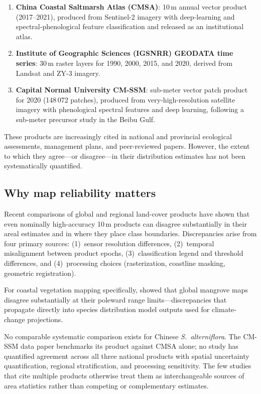 \documentclass[11pt]{article}
\begin{document}
\begin{enumerate}[nosep]
\item \textbf{China Coastal Saltmarsh Atlas (CMSA)}: 10\,m annual vector product
  (2017--2021), produced from Sentinel-2 imagery with deep-learning and
  spectral-phenological feature classification\citep{li_2024_cmsa} and released
  as an institutional atlas\citep{cmsa_2024_release}.
\item \textbf{Institute of Geographic Sciences (IGSNRR) GEODATA time series}:
  30\,m raster layers for 1990, 2000, 2015, and 2020, derived from Landsat and
  ZY-3 imagery\citep{geodata_time_series}.
\item \textbf{Capital Normal University CM-SSM}: sub-meter vector patch product
  for 2020 (148\,072 patches), produced from very-high-resolution satellite
  imagery with phenological spectral features and deep learning, following a
  sub-meter precursor study in the Beibu Gulf\citep{zhou_2025_cmssm,
  zhou_2024_ijde_beibu}.
\end{enumerate}

These products are increasingly cited in national and provincial ecological
assessments, management plans, and peer-reviewed papers. However, the extent
to which they agree---or disagree---in their distribution estimates has not been
systematically quantified.

\subsection{Why map reliability matters}

Recent comparisons of global and regional land-cover products
\citep{wang_2024_ijde, zhao_2023_rs, xu_2024_rse, ding_2022_rs,
zhong_2023_ocm} have shown that
even nominally high-accuracy 10\,m products can disagree substantially in
their areal estimates and in where they place class boundaries. Discrepancies
arise from four primary sources:
(1)~sensor resolution differences, (2)~temporal misalignment between product
epochs, (3)~classification legend and threshold differences, and
(4)~processing choices (rasterization, coastline masking, geometric
registration).

For coastal vegetation mapping specifically, \citet{ximenes_2023_stoten}
showed that global mangrove maps disagree substantially at their poleward
range limits---discrepancies that propagate directly
into species distribution model outputs used for climate-change projections.

No comparable systematic comparison exists for Chinese \textit{S.~alterniflora}.
The CM-SSM data paper benchmarks its product against CMSA
alone\citep{zhou_2025_cmssm}; no study has quantified agreement across all
three national products with spatial uncertainty quantification, regional
stratification, and processing sensitivity. The few studies that cite multiple
products otherwise treat them as interchangeable sources
of area statistics rather than competing or complementary estimates.
\end{document}
